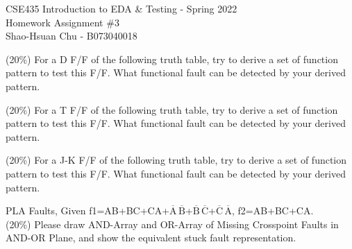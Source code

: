 \documentclass[12pt,answers]{exam}
\begin{document}
\begin{center}
\LARGE CSE435 Introduction to EDA \& Testing - Spring 2022 \\
\Large Homework Assignment \#3 \\
\Large Shao-Hsuan Chu - B073040018 \\
\end{center}
\bigskip

\begin{questions}
  \question (20\%) For a D F/F of the following truth table, try to derive a set of function pattern to test this F/F. What functional fault can be detected by your derived pattern.
  
  \begin{solution}
  
  \end{solution}

  \question (20\%) For a T F/F of the following truth table, try to derive a set of function pattern to test this F/F. What functional fault can be detected by your derived pattern.
  
  \begin{solution}
  
  \end{solution}

  \question (20\%) For a J-K F/F of the following truth table, try to derive a set of function pattern to test this F/F. What functional fault can be detected by your derived pattern.
  
  \begin{solution}
  
  \end{solution}

  \question PLA Faults, Given f1=AB+BC+CA+$\overline{\text{A}}\,\overline{\text{B}}$+$\overline{\text{B}}\,\overline{\text{C}}$+$\overline{\text{C}}\,\overline{\text{A}}$, f2=AB+BC+CA. \\
(20\%) Please draw AND-Array and OR-Array of Missing Crosspoint Faults in AND-OR Plane, and show the equivalent stuck fault representation.


\end{questions}
\end{document}
